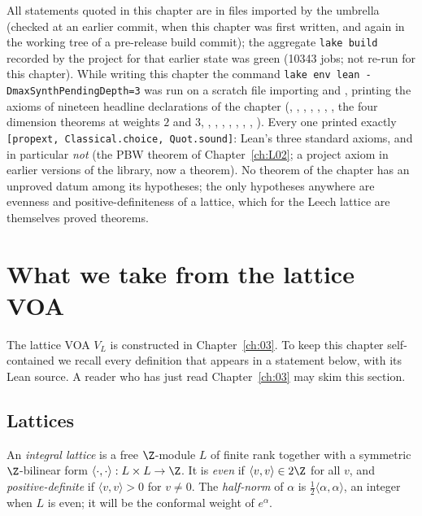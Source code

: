 \begin{status}
All statements quoted in this chapter are in files imported by the umbrella
 (checked at an earlier commit, when this chapter was first
written, and again in the working tree of a pre-release build commit); the
aggregate \texttt{lake build} recorded by the project for that earlier state was green
(10343 jobs; not re-run for this chapter). While writing this chapter the command
\texttt{lake env lean -DmaxSynthPendingDepth=3} was run on a scratch file importing
 and , printing the
axioms of nineteen headline declarations of the chapter (,
, , ,
, , ,
the four dimension theorems at weights $2$ and $3$, ,
, ,
, , ,
, ). Every one printed exactly
\texttt{[propext, Classical.choice, Quot.sound]}: Lean's three standard axioms, and in particular
\emph{not}  (the PBW theorem of Chapter~\ref{ch:L02}; a project axiom in earlier versions of the library, now a theorem). No theorem of the chapter has an unproved datum
among its hypotheses; the only hypotheses anywhere are evenness and positive-definiteness of a
lattice, which for the Leech lattice are themselves proved theorems.
\end{status}

\section{What we take from the lattice VOA}\label{ch04:sec:recall}

The lattice VOA $V_L$ is constructed in Chapter~\ref{ch:03}. To keep this chapter self-contained
we recall every definition that appears in a statement below, with its Lean source. A reader who
has just read Chapter~\ref{ch:03} may skim this section.

\subsection{Lattices}

\begin{definition}\label{ch04:def:lattice}
An \emph{integral lattice} is a free $\Z$-module $L$ of finite rank together with a symmetric
$\Z$-bilinear form $\langle\cdot,\cdot\rangle:L\times L\to\Z$. It is \emph{even} if
$\langle v,v\rangle\in 2\Z$ for all $v$, and \emph{positive-definite} if $\langle v,v\rangle>0$ for
$v\neq0$. The \emph{half-norm} of $\alpha$ is $\tfrac12\langle\alpha,\alpha\rangle$, an integer
when $L$ is even; it will be the conformal weight of $e^\alpha$.
\end{definition}

